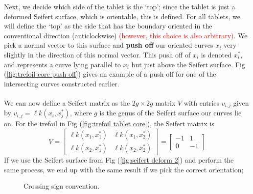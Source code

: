 \documentclass{article}
\begin{document}
Next, we decide which side of the tablet is the `top'; since the tablet is just a deformed Seifert surface, which is orientable, this is defined. For all tablets, we will define the `top' as the side that has the boundary oriented in the conventional direction (anticlockwise) \textcolor{red}{(however, this choice is also arbitrary)}. We pick a normal vector to this surface and \textbf{push off} our oriented curves $x_i$ very slightly in the direction of this normal vector. This push off of $x_i$ is denoted $x^*_i$, and represents a curve lying parallel to $x_i$ but just above the Seifert surface. Fig (\ref{fig:trefoil core push off}) gives an example of a push off for one of the intersecting curves constructed earlier.\\
\\
We can now define a Seifert matrix as the $2g \times 2g$ matrix $V$ with entries $v_{i,j}$ given by $v_{i,j}=\ell k(x_i,x^*_j)$, where $g$ is the genus of the Seifert surface our curves lie on. For the trefoil in Fig (\ref{fig:trefoil tablet core}), the Seifert matrix is
$$V=\begin{bmatrix}\ell k(x_1,x^*_1)&\ell k(x_1,x^*_2)\\\ell k(x_2,x^*_1)&\ell k(x_2,x^*_2)\end{bmatrix}=\begin{bmatrix}-1&1\\0&-1\end{bmatrix}$$
If we use the Seifert surface from Fig (\ref{fig:seifert deform 2}) and perform the same process, we end up with the same result if we pick the correct orientation;
\begin{figure}
\centering
{}
\caption{Crossing sign convention.}
\label{fig:crossing sign}
\end{figure}
\end{document}
